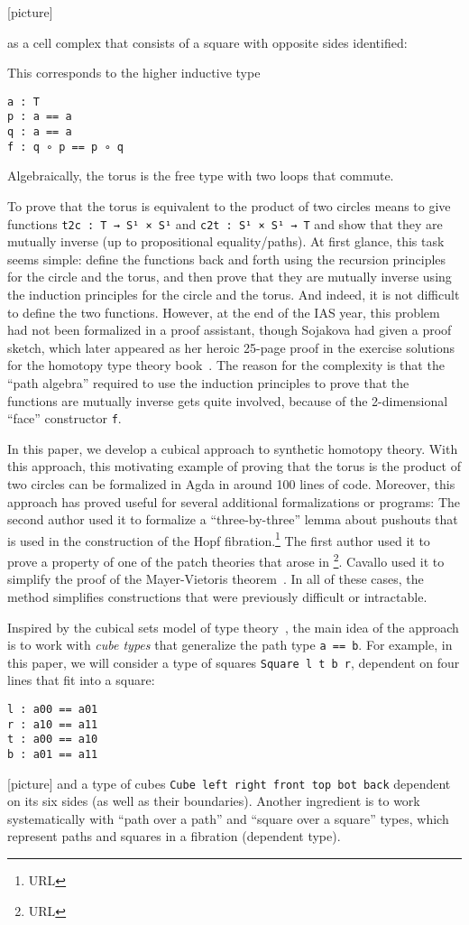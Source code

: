 [picture]

as a cell complex that consists of a square with opposite sides
identified:

This corresponds to the higher inductive type
\begin{verbatim}
a : T
p : a == a
q : a == a
f : q ∘ p == p ∘ q
\end{verbatim}
Algebraically, the torus is the free type with two loops that commute.

To prove that the torus is equivalent to the product of two circles
means to give functions \verb|t2c : T → S¹ × S¹| and
\verb|c2t : S¹ × S¹ → T| and show that they are mutually inverse (up to
propositional equality/paths).  At first glance, this task seems simple:
define the functions back and forth using the recursion principles for
the circle and the torus, and then prove that they are mutually inverse
using the induction principles for the circle and the torus.  And
indeed, it is not difficult to define the two functions.  However, at
the end of the IAS year, this problem had not been formalized in a proof
assistant, though Sojakova had given a proof sketch, which later
appeared as her heroic 25-page proof in the exercise solutions for the
homotopy type theory book~\citep{uf13hott-book}.  The reason for the
complexity is that the ``path algebra'' required to use the induction
principles to prove that the functions are mutually inverse gets quite
involved, because of the 2-dimensional ``face'' constructor \verb|f|.

In this paper, we develop a cubical approach to synthetic homotopy
theory.  With this approach, this motivating example of proving that the
torus is the product of two circles can be formalized in Agda in around
100 lines of code.  Moreover, this approach has proved useful for
several additional formalizations or programs: The second author used it
to formalize a ``three-by-three'' lemma about pushouts that is used in
the construction of the Hopf fibration.\footnote{URL} The first author
used it to prove a property of one of the patch theories that arose in
\citep{amlh14patch}\footnote{URL}.  Cavallo used it to simplify the
proof of the Mayer-Vietoris theorem~\citep{cavallo}.  In all of these
cases, the method simplifies constructions that were previously
difficult or intractable. 

Inspired by the cubical sets model of type
theory~\citep{coquand+13cubical}, the main idea of the approach is to
work with \emph{cube types} that generalize the path type \verb|a == b|.
For example, in this paper, we will consider a type of squares
\verb|Square l t b r|, dependent on four lines that fit into a square:
\begin{verbatim}
l : a00 == a01
r : a10 == a11
t : a00 == a10
b : a01 == a11
\end{verbatim}
[picture] and a type of cubes \verb|Cube left right front top bot back|
dependent on its six sides (as well as their boundaries).  Another
ingredient is to work systematically with ``path over a path'' and
``square over a square'' types, which represent paths and squares in a
fibration (dependent type).

